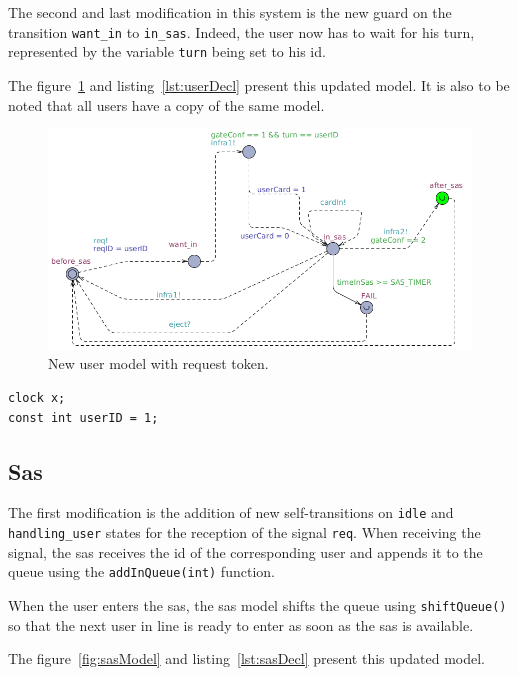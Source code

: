 \documentclass[10pt,a4paper]{article}
\begin{document}
The second and last modification in this system is the new guard on the transition \texttt{want\_in} to \texttt{in\_sas}. Indeed, the user now has to wait for his turn, represented by the variable \texttt{turn} being set to his id.

The figure~\ref{fig:userModel} and listing~\ref{lst:userDecl} present this updated model. It is also to be noted that all users have a copy of the same model.

\begin{figure}[!h]
	\centering
    \includegraphics[width=\textwidth]{userModel}
    \caption{New user model with request token.}
    \label{fig:userModel}
\end{figure}

\begin{lstlisting}[caption=Declarations of user model., label=lst:userDecl]
clock x;
const int userID = 1;
\end{lstlisting}

\subsection{Sas}
The first modification is the addition of new self-transitions on \texttt{idle} and \texttt{handling\_user} states for the reception of the signal \texttt{req}.
When receiving the signal, the sas receives the id of the corresponding user and appends it to the queue using the \texttt{addInQueue(int)} function.

When the user enters the sas, the sas model shifts the queue using \texttt{shiftQueue()} so that the next user in line is ready to enter as soon as the sas is available.

The figure~\ref{fig:sasModel} and listing~\ref{lst:sasDecl} present this updated model.
\end{document}

